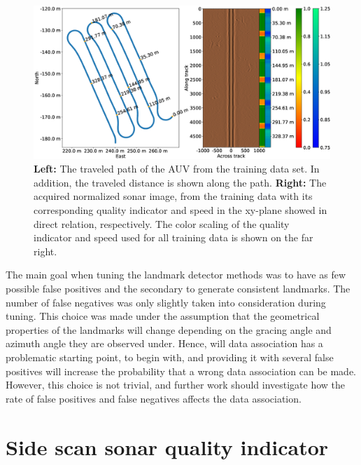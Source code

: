 \begin{figure}
    \centering
    \includegraphics[trim=0cm 1.4cm 0cm 3.1cm, clip=true, width=1.0\textwidth]{figures/path_sonar_colorbars_training.eps}
    \caption{\textbf{Left:} The traveled path of the AUV from the training data set. In addition, the traveled distance is shown along the path. \textbf{Right:} The acquired normalized sonar image, from the training data with its corresponding quality indicator and speed in the xy-plane showed in direct relation, respectively. The color scaling of the quality indicator and speed used for all training data is shown on the far right.}
    \label{fig:path_sonar_colorbars}
\end{figure}

The main goal when tuning the landmark detector methods was to have as few possible false positives and the secondary to generate consistent landmarks. The number of false negatives was only slightly taken into consideration during tuning. This choice was made under the assumption that the geometrical properties of the landmarks will change depending on the gracing angle and azimuth angle they are observed under. Hence, will data association has a problematic starting point, to begin with, and providing it with several false positives will increase the probability that a wrong data association can be made. However, this choice is not trivial, and further work should investigate how the rate of false positives and false negatives affects the data association.

\section{Side scan sonar quality indicator}

